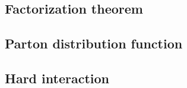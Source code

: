 \subsection{Factorization theorem}

\subsection{Parton distribution function}

\subsection{Hard interaction}

